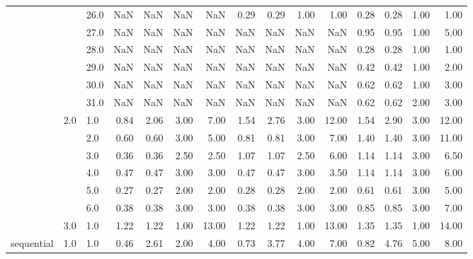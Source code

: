 \begin{tabular}{lllrrrrrrrrrrrr}
           &     & 26.0 &        NaN &       NaN &  NaN &    NaN &       0.29 &      0.29 & 1.00 &   1.00 &       0.28 &      0.28 & 1.00 &   1.00 \\
           &     & 27.0 &        NaN &       NaN &  NaN &    NaN &        NaN &       NaN &  NaN &    NaN &       0.95 &      0.95 & 1.00 &   5.00 \\
           &     & 28.0 &        NaN &       NaN &  NaN &    NaN &        NaN &       NaN &  NaN &    NaN &       0.28 &      0.28 & 1.00 &   1.00 \\
           &     & 29.0 &        NaN &       NaN &  NaN &    NaN &        NaN &       NaN &  NaN &    NaN &       0.42 &      0.42 & 1.00 &   2.00 \\
           &     & 30.0 &        NaN &       NaN &  NaN &    NaN &        NaN &       NaN &  NaN &    NaN &       0.62 &      0.62 & 1.00 &   3.00 \\
           &     & 31.0 &        NaN &       NaN &  NaN &    NaN &        NaN &       NaN &  NaN &    NaN &       0.62 &      0.62 & 2.00 &   3.00 \\
           & 2.0 & 1.0  &       0.84 &      2.06 & 3.00 &   7.00 &       1.54 &      2.76 & 3.00 &  12.00 &       1.54 &      2.90 & 3.00 &  12.00 \\
           &     & 2.0  &       0.60 &      0.60 & 3.00 &   5.00 &       0.81 &      0.81 & 3.00 &   7.00 &       1.40 &      1.40 & 3.00 &  11.00 \\
           &     & 3.0  &       0.36 &      0.36 & 2.50 &   2.50 &       1.07 &      1.07 & 2.50 &   6.00 &       1.14 &      1.14 & 3.00 &   6.50 \\
           &     & 4.0  &       0.47 &      0.47 & 3.00 &   3.00 &       0.47 &      0.47 & 3.00 &   3.50 &       1.14 &      1.14 & 3.00 &   6.00 \\
           &     & 5.0  &       0.27 &      0.27 & 2.00 &   2.00 &       0.28 &      0.28 & 2.00 &   2.00 &       0.61 &      0.61 & 3.00 &   5.00 \\
           &     & 6.0  &       0.38 &      0.38 & 3.00 &   3.00 &       0.38 &      0.38 & 3.00 &   3.00 &       0.85 &      0.85 & 3.00 &   7.00 \\
           & 3.0 & 1.0  &       1.22 &      1.22 & 1.00 &  13.00 &       1.22 &      1.22 & 1.00 &  13.00 &       1.35 &      1.35 & 1.00 &  14.00 \\
sequential & 1.0 & 1.0  &       0.46 &      2.61 & 2.00 &   4.00 &       0.73 &      3.77 & 4.00 &   7.00 &       0.82 &      4.76 & 5.00 &   8.00 \\

\end{tabular}
